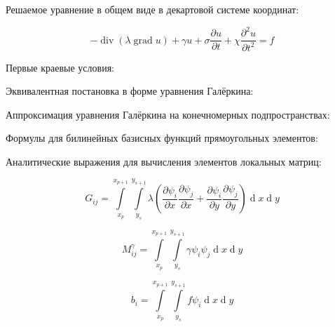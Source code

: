 \newcommand{\ltcell}[1]{\begin{tabular}{@{}l@{}}#1\end{tabular}}

\setcounter{secnumdepth}{4} %
\newcommand{\myparagraph}[1]{\paragraph{#1}\mbox{}\\} %

\newcommand{\roubr}[1]{\left(#1\right)}  %
\newcommand{\sqbr}[1]{\left[#1\right]}   %
\newcommand{\cubr}[1]{\left\{#1\right\}} %

\newcommand{\mb}[1]{\mathbf{#1}}

\newcommand{\myd}[1]{\operatorname{d}\!#1}

\newcommand{\mydiv}[0]{\operatorname{div}}
\newcommand{\mygrad}[0]{\operatorname{grad}}
\newcommand{\mypartial}[2]{\frac{\partial #1}{\partial #2}}
\newcommand{\mypartialpow}[3]{\frac{\partial^{#3} #1}{\partial #2^{#3}}}
\newcommand{\myintegral}[2]{\int\limits_{#1}^{#2}}

Решаемое уравнение в общем виде в декартовой системе координат:

$$ -\mydiv\roubr{\lambda\mygrad u} + \gamma u + \sigma \mypartial{u}{t} + \chi \mypartialpow{u}{t}{2} = f $$

Первые краевые условия:

Эквивалентная постановка в форме уравнения Галёркина:

Аппроксимация уравнения Галёркина на конечномерных подпространствах:

Формулы для билинейных базисных функций прямоугольных элементов:

Аналитические выражения для вычисления элементов локальных матриц:

$$ G_{ij} = \myintegral{x_p}{x_{p+1}}\myintegral{y_s}{y_{s+1}} \lambda\roubr{\mypartial{\psi_i}{x}\mypartial{\psi_j}{x} + \mypartial{\psi_i}{y}\mypartial{\psi_j}{y}} \myd{x} \myd{y} $$

$$ M_{ij}^\gamma = \myintegral{x_p}{x_{p+1}}\myintegral{y_s}{y_{s+1}} \gamma \psi_i \psi_j \myd{x} \myd{y} $$

$$ b_i = \myintegral{x_p}{x_{p+1}}\myintegral{y_s}{y_{s+1}} f \psi_i \myd{x} \myd{y} $$

